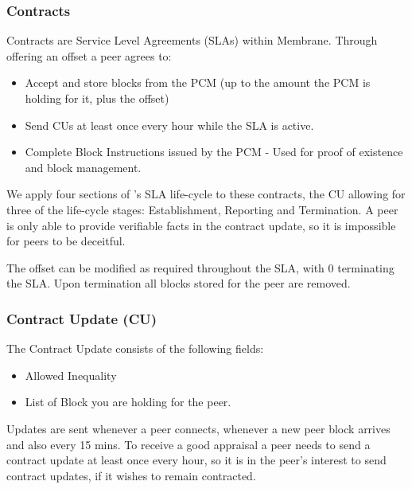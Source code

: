 \documentclass[11pt, a4paper, twocolumn, twoside]{report}
\begin{document}
\subsubsection{Contracts}

Contracts are Service Level Agreements (SLAs) within Membrane. Through offering an offset a peer agrees to:

\begin{itemize}
 \item Accept and store blocks from the PCM (up to the amount the PCM is holding for it, plus the offset)
 \item Send CUs at least once every hour while the SLA is active.
 \item Complete Block Instructions issued by the PCM - Used for proof of existence and block management.
\end{itemize}

We apply four sections of \cite{keller2002defining}'s SLA life-cycle to these contracts, the CU allowing for three of the life-cycle stages: Establishment, Reporting and Termination. A peer is only able to provide verifiable facts in the contract update, so it is impossible for peers to be deceitful.

The offset can be modified as required throughout the SLA, with 0 terminating the SLA. Upon termination all blocks stored for the peer are removed.

\subsubsection{Contract Update (CU)}

The Contract Update consists of the following fields:

\begin{itemize}
 \item Allowed Inequality
 \item List of Block you are holding for the peer.
\end{itemize}

Updates are sent whenever a peer connects, whenever a new peer block arrives and also every 15 mins. To receive a good appraisal a peer needs to send a contract update at least once every hour, so it is in the peer's interest to send contract updates, if it wishes to remain contracted.
\end{document}
